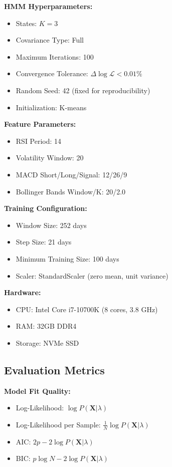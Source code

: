\documentclass[conference]{IEEEtran}
\begin{document}
\textbf{HMM Hyperparameters:}
\begin{itemize}
\item States: $K = 3$
\item Covariance Type: Full
\item Maximum Iterations: 100
\item Convergence Tolerance: $\Delta\log\mathcal{L} < 0.01\%$
\item Random Seed: 42 (fixed for reproducibility)
\item Initialization: K-means
\end{itemize}

\textbf{Feature Parameters:}
\begin{itemize}
\item RSI Period: 14
\item Volatility Window: 20
\item MACD Short/Long/Signal: 12/26/9
\item Bollinger Bands Window/K: 20/2.0
\end{itemize}

\textbf{Training Configuration:}
\begin{itemize}
\item Window Size: 252 days
\item Step Size: 21 days
\item Minimum Training Size: 100 days
\item Scaler: StandardScaler (zero mean, unit variance)
\end{itemize}

\textbf{Hardware:}
\begin{itemize}
\item CPU: Intel Core i7-10700K (8 cores, 3.8 GHz)
\item RAM: 32GB DDR4
\item Storage: NVMe SSD
\end{itemize}

\subsection{Evaluation Metrics}

\textbf{Model Fit Quality:}
\begin{itemize}
\item Log-Likelihood: $\log P(\mathbf{X}|\lambda)$
\item Log-Likelihood per Sample: $\frac{1}{N}\log P(\mathbf{X}|\lambda)$
\item AIC: $2p - 2\log P(\mathbf{X}|\lambda)$
\item BIC: $p\log N - 2\log P(\mathbf{X}|\lambda)$
\end{itemize}
\end{document}
